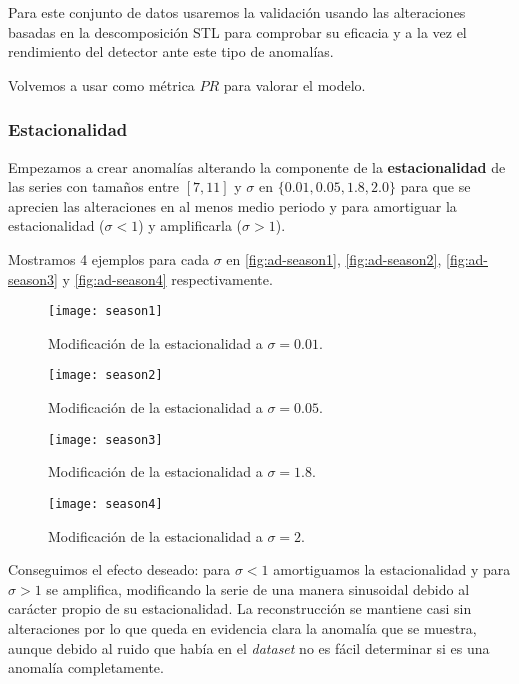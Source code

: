 Para este conjunto de datos usaremos la validación usando las alteraciones basadas en la descomposición STL para comprobar su eficacia y a la vez el rendimiento del detector ante este tipo de anomalías.

Volvemos a usar como métrica $PR$ para valorar el modelo.

\subsubsection{Estacionalidad}

Empezamos a crear anomalías alterando la componente de la \textbf{estacionalidad} de las series con tamaños entre $[7, 11]$ y $\sigma$ en $\{0.01, 0.05, 1.8, 2.0\}$ para que se aprecien las alteraciones en al menos medio periodo y para amortiguar la estacionalidad ($\sigma < 1$) y amplificarla ($\sigma > 1$).

Mostramos 4 ejemplos para cada $\sigma$ en \autoref{fig:ad-season1}, \autoref{fig:ad-season2}, \autoref{fig:ad-season3} y \autoref{fig:ad-season4} respectivamente.

\begin{figure}[htpb]
  \centering
  \texttt{[image: season1]}
  \caption{Modificación de la estacionalidad a $\sigma = 0.01$.}
  \label{fig:ad-season1}
\end{figure}

\begin{figure}[htpb]
  \centering
  \texttt{[image: season2]}
  \caption{Modificación de la estacionalidad a $\sigma = 0.05$.}
  \label{fig:ad-season2}
\end{figure}

\begin{figure}[htpb]
  \centering
  \texttt{[image: season3]}
  \caption{Modificación de la estacionalidad a $\sigma = 1.8$.}
  \label{fig:ad-season3}
\end{figure}

\begin{figure}[htpb]
  \centering
  \texttt{[image: season4]}
  \caption{Modificación de la estacionalidad a $\sigma = 2$.}
  \label{fig:ad-season4}
\end{figure}

Conseguimos el efecto deseado: para $\sigma < 1$ amortiguamos la estacionalidad y para $\sigma > 1$ se amplifica, modificando la serie de una manera sinusoidal debido al carácter propio de su estacionalidad. La reconstrucción se mantiene casi sin alteraciones por lo que queda en evidencia clara la anomalía que se muestra, aunque debido al ruido que había en el \emph{dataset} no es fácil determinar si es una anomalía completamente.

